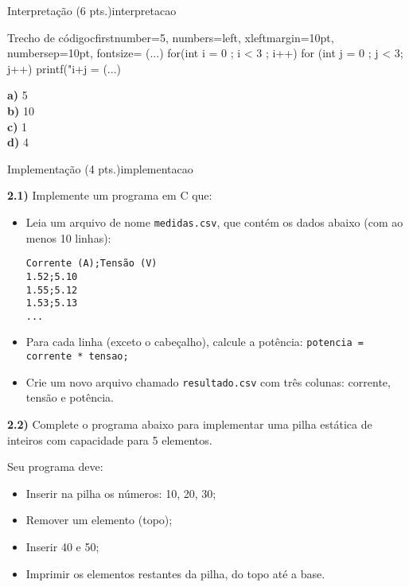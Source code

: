 \begin{problem}{Interpretação (6 pts.)}{interpretacao}
\begin{mylisting}[enhanced]{Trecho de código}{c}{firstnumber=5, numbers=left, xleftmargin=10pt, numbersep=10pt, fontsize=\small}
(...)
for(int i = 0  ;  i < 3 ;  i++)
    for (int j = 0 ; j < 3; j++)
        printf("i+j = %
(...)
\end{mylisting}

\textbf{a)} 5\\  
\textbf{b)} 10\\  
\textbf{c)} 1\\  
\textbf{d)} 4\\  

\end{problem}

\begin{problem}{Implementação (4 pts.)}{implementacao}
    
\textbf{2.1)} Implemente um programa em C que:

\begin{itemize}
    \item Leia um arquivo de nome \texttt{medidas.csv}, que contém os dados abaixo (com ao menos 10 linhas):

\begin{verbatim}
Corrente (A);Tensão (V)
1.52;5.10
1.55;5.12
1.53;5.13
...
\end{verbatim}

    \item Para cada linha (exceto o cabeçalho), calcule a potência: \texttt{potencia = corrente * tensao;}
    \item Crie um novo arquivo chamado \texttt{resultado.csv} com três colunas: corrente, tensão e potência.
\end{itemize}

\vspace{1em}

\textbf{2.2)} Complete o programa abaixo para implementar uma pilha estática de inteiros com capacidade para 5 elementos.

Seu programa deve:
\begin{itemize}
    \item Inserir na pilha os números: 10, 20, 30;
    \item Remover um elemento (topo);
    \item Inserir 40 e 50;
    \item Imprimir os elementos restantes da pilha, do topo até a base.
\end{itemize}


\end{problem}
